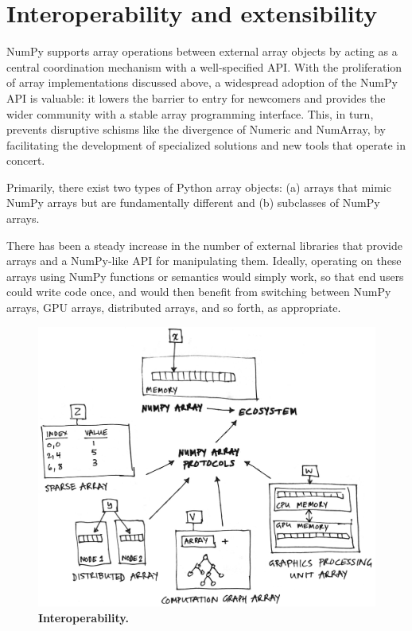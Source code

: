 

\section*{Interoperability and extensibility}

NumPy supports array operations between external array objects by
acting as a central coordination mechanism with a well-specified API.
With the proliferation of array implementations discussed above, a
widespread adoption of the NumPy API is valuable: it lowers the
barrier to entry for newcomers and provides the wider community with a
stable array programming interface. This, in turn, prevents disruptive
schisms like the divergence of Numeric and NumArray, by facilitating
the development of specialized solutions and new tools that operate in
concert.

Primarily, there
exist two types of Python array objects: (a) arrays that mimic NumPy arrays but are
fundamentally different and (b) subclasses of NumPy arrays.

There has been a steady increase in the number of external libraries that
provide arrays and a NumPy-like API for manipulating them.
Ideally, operating on these arrays using NumPy functions or semantics would
simply work, so that end users could write code once, and would then benefit
from switching between NumPy arrays, GPU arrays, distributed arrays, and so
forth, as appropriate.

\begin{figure}
  \centering
  \includegraphics[width=.45\textwidth]{static/sketches/duck-arrays}
  \caption{\textbf{Interoperability.} }\label{fig:duck-arrays}
\end{figure}


